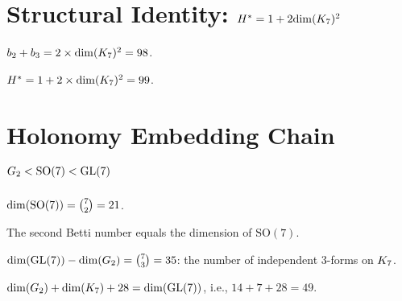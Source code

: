 \section{Structural Identity: $H^* = 1 + 2 \mathrm{dim}(K_7)^2$}

\begin{theorem}\label{thm:betti_pair_K7_sq}
    \leanok
    $b_2 + b_3 = 2 \times \mathrm{dim}(K_7)^2 = 98$.
\end{theorem}

\begin{theorem}\label{thm:H_star_structural}
    \leanok
    $H^* = 1 + 2 \times \mathrm{dim}(K_7)^2 = 99$.
\end{theorem}

\section{Holonomy Embedding Chain $G_2 < \mathrm{SO}(7) < \mathrm{GL}(7)$}

\begin{definition}\label{def:dim_SO7}
    \leanok
    $\mathrm{dim}(\mathrm{SO}(7)) = \binom{7}{2} = 21$.
\end{definition}

\begin{theorem}[$\opdim(\mathrm{SO}(7)) = \btwo$]\label{thm:SO7_eq_b2}
    \leanok
    The second Betti number equals the dimension of $\mathrm{SO}(7)$.
\end{theorem}

\begin{theorem}[Codimension $\mathrm{GL}(7)/\Gtwo = \binom{7}{3}$]\label{thm:codim_3forms}
    \leanok
    $\mathrm{dim}(\mathrm{GL}(7)) - \mathrm{dim}(G_2) = \binom{7}{3} = 35$: the number of
    independent 3-forms on $K_7$.
\end{theorem}

\begin{theorem}\label{thm:chain_additive}
    \leanok
    $\mathrm{dim}(G_2) + \mathrm{dim}(K_7) + 28 = \mathrm{dim}(\mathrm{GL}(7))$, i.e., $14 + 7 + 28 = 49$.
\end{theorem}

